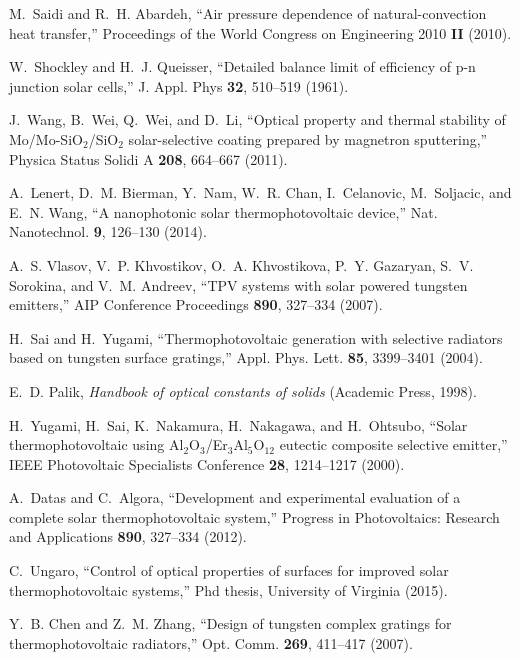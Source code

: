 \documentclass[10pt,letterpaper]{article}
\begin{document}
\begin{thebibliography}{100}
M.~Saidi and R.~H. Abardeh, \enquote{Air pressure dependence of
  natural-convection heat transfer,} Proceedings of the World Congress on
  Engineering 2010 \textbf{II} (2010).

W.~Shockley and H.~J. Queisser, \enquote{Detailed balance limit of efficiency
  of p-n junction solar cells,} J. Appl. Phys \textbf{32}, 510--519 (1961).

J.~Wang, B.~Wei, Q.~Wei, and D.~Li, \enquote{{Optical property and thermal
  stability of {M}o/{M}o-{S}i{O}$_2$/{S}i{O}$_2$ solar-selective coating
  prepared by magnetron sputtering},} Physica Status Solidi A \textbf{208},
  664--667 (2011).

A.~Lenert, D.~M. Bierman, Y.~Nam, W.~R. Chan, I.~Celanovic, M.~Soljacic, and
  E.~N. Wang, \enquote{A nanophotonic solar thermophotovoltaic device,} Nat.
  Nanotechnol. \textbf{9}, 126--130 (2014).

A.~S. Vlasov, V.~P. Khvostikov, O.~A. Khvostikova, P.~Y. Gazaryan, S.~V.
  Sorokina, and V.~M. Andreev, \enquote{{TPV systems with solar powered
  tungsten emitters},} AIP Conference Proceedings \textbf{890}, 327--334
  (2007).

H.~Sai and H.~Yugami, \enquote{Thermophotovoltaic generation with selective
  radiators based on tungsten surface gratings,} Appl. Phys. Lett. \textbf{85},
  3399--3401 (2004).

E.~D. Palik, \emph{Handbook of optical constants of solids} (Academic Press,
  1998).

H.~Yugami, H.~Sai, K.~Nakamura, H.~Nakagawa, and H.~Ohtsubo, \enquote{Solar
  thermophotovoltaic using {A}l$_2${O}$_3$/{E}r$_3${A}l$_5${O}$_{12}$ eutectic
  composite selective emitter,} IEEE Photovoltaic Specialists Conference
  \textbf{28}, 1214--1217 (2000).

A.~Datas and C.~Algora, \enquote{Development and experimental evaluation of a
  complete solar thermophotovoltaic system,} Progress in Photovoltaics:
  Research and Applications \textbf{890}, 327--334 (2012).

C.~Ungaro, \enquote{{Control of optical properties of surfaces for improved
  solar thermophotovoltaic systems},} Phd thesis, University of Virginia
  (2015).

Y.~B. Chen and Z.~M. Zhang, \enquote{Design of tungsten complex gratings for
  thermophotovoltaic radiators,} Opt. Comm. \textbf{269}, 411--417 (2007).


\end{thebibliography}
\end{document}
